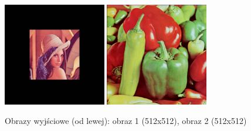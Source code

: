 \documentclass[final,a4paper,openany,12pt]{mwbk}
\begin{document}
\begin{figure}[H]
	\begin{center}
		\includegraphics[width=0.4\textwidth]{lena_color_unificationGeo_result}
		\includegraphics[width=0.4\textwidth]{peppers_color_unificationGeo_result}
	\end{center}
	\caption{Obrazy wyjściowe (od lewej): obraz 1 (512x512), obraz 2 (512x512)}
\end{figure}

\end{document}
